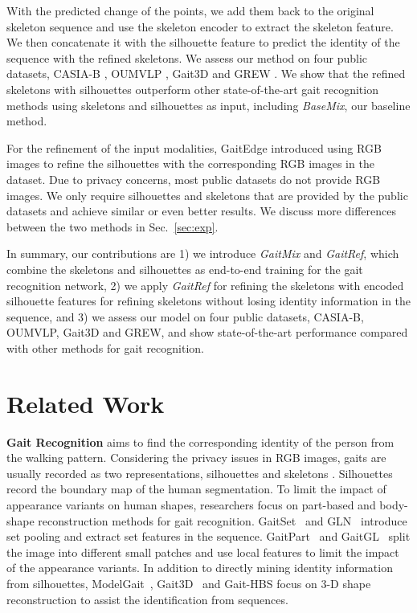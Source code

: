 \documentclass[10pt,twocolumn,letterpaper]{article}
\begin{document}
With the predicted change of the points, we add them back to the original skeleton sequence and use the skeleton encoder to extract the skeleton feature. We then concatenate it with the silhouette feature to predict the identity of the sequence with the refined skeletons.
We assess our method on four public datasets, CASIA-B \cite{yu2006framework}, OUMVLP \cite{takemura2018multi}, Gait3D \cite{zheng2022gait} and GREW \cite{zhu2021gait}. We show that the refined skeletons with silhouettes outperform other state-of-the-art gait recognition methods using skeletons and silhouettes as input, including \textit{BaseMix}, our baseline method.

For the refinement of the input modalities, GaitEdge \cite{liang2022gaitedge} introduced using RGB images to refine the silhouettes with the corresponding RGB images in the dataset. Due to privacy concerns, most public datasets \cite{takemura2018multi,zheng2022gait,zhu2021gait} do not provide RGB images. We only require silhouettes and skeletons that are provided by the public datasets and achieve similar or even better results. We  discuss more differences between the two methods in Sec.~\ref{sec:exp}.

In summary, our contributions are 1) we introduce \textit{GaitMix} and \textit{GaitRef}, which combine the skeletons and silhouettes as end-to-end training for the gait recognition network, 2) we apply \textit{GaitRef} for refining the skeletons with encoded silhouette features for refining skeletons without losing identity information in the sequence, and 3) we assess our model on four public datasets, CASIA-B, OUMVLP, Gait3D and GREW, and show state-of-the-art performance compared with other methods for gait recognition.


 \section{Related Work}

\textbf{Gait Recognition} aims to find the corresponding identity of the person from the walking pattern. Considering the privacy issues in RGB images, gaits are usually recorded as two representations, silhouettes \cite{yu2006framework,takemura2018multi} and skeletons \cite{an2020performance}. Silhouettes record the boundary map of the human segmentation. To limit the impact of appearance variants on human shapes, researchers focus on part-based and body-shape reconstruction methods for gait recognition. GaitSet~\cite{chao2019gaitset} and GLN~\cite{hou2020gln} introduce set pooling and extract set features in the sequence. GaitPart~\cite{fan2020gaitpart} and GaitGL~\cite{lin2021gaitgl} split the image into different small patches and use local features to limit the impact of the appearance variants. In addition to directly mining identity information from silhouettes, ModelGait~\cite{li2020end}, Gait3D~\cite{zheng2022gait} and Gait-HBS \cite{zhu2023gait} focus on 3-D shape reconstruction to assist the identification from sequences. 
\end{document}

